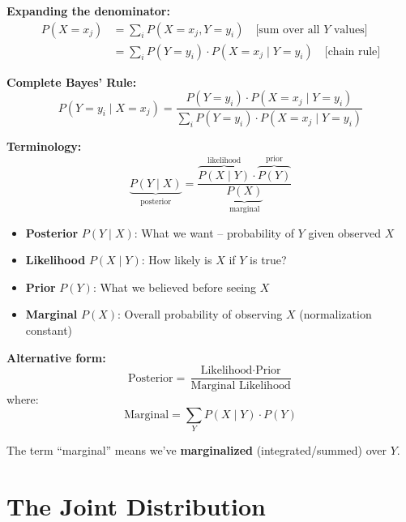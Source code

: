 \textbf{Expanding the denominator:}
\begin{align*}
P(X = x_j) &= \sum_{i} P(X = x_j, Y = y_i) \quad \text{[sum over all $Y$ values]} \\
           &= \sum_{i} P(Y = y_i) \cdot P(X = x_j \mid Y = y_i) \quad \text{[chain rule]}
\end{align*}

\textbf{Complete Bayes' Rule:}
\[
P(Y = y_i \mid X = x_j) = \frac{P(Y = y_i) \cdot P(X = x_j \mid Y = y_i)}{\sum_{i} P(Y = y_i) \cdot P(X = x_j \mid Y = y_i)}
\]

\textbf{Terminology:}
\[
\underbrace{P(Y \mid X)}_{\text{posterior}} = \frac{\overbrace{P(X \mid Y)}^{\text{likelihood}} \cdot \overbrace{P(Y)}^{\text{prior}}}{\underbrace{P(X)}_{\text{marginal}}}
\]

\begin{itemize}
    \item \textbf{Posterior} $P(Y \mid X)$: What we want -- probability of $Y$ given observed $X$
    \item \textbf{Likelihood} $P(X \mid Y)$: How likely is $X$ if $Y$ is true?
    \item \textbf{Prior} $P(Y)$: What we believed before seeing $X$
    \item \textbf{Marginal} $P(X)$: Overall probability of observing $X$ (normalization constant)
\end{itemize}

\textbf{Alternative form:}
\[
\text{Posterior} = \frac{\text{Likelihood} \cdot \text{Prior}}{\text{Marginal Likelihood}}
\]
where:
\[
\text{Marginal} = \sum_{Y} P(X \mid Y) \cdot P(Y)
\]

The term ``marginal'' means we've \textbf{marginalized} (integrated/summed) over $Y$.

\section{The Joint Distribution}


